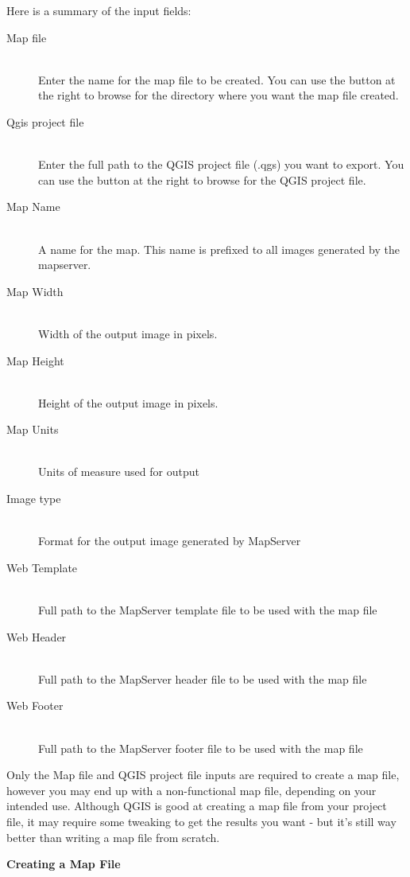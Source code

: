   Here is a summary of the input fields:
  \begin{description}

    \item [Map file] \mbox{}\\
Enter the name for the map file to be created. You can use the button at the right to browse for the directory where you want the map file created. 

\item [Qgis project file] \mbox{}\\
Enter the full path to the QGIS project file (.qgs) you want to export. You can use the button at the right to browse for the QGIS project file.
\item [Map Name] \mbox{}\\
A name for the map. This name is prefixed to all images generated by the mapserver.
\item [Map Width] \mbox{}\\
Width of the output image in pixels.

\item [Map Height] \mbox{}\\
Height of the output image in pixels.
\item [Map Units] \mbox{}\\
Units of measure used for output
\item [Image type] \mbox{}\\
Format for the output image generated by MapServer
\item [Web Template] \mbox{}\\
Full path to the MapServer template file to be used with the map file
\item [Web Header] \mbox{}\\
Full path to the MapServer header file to be used with the map file
\item [Web Footer] \mbox{}\\
Full path to the MapServer footer file to be used with the map file
\end{description}

Only the Map file and QGIS project file inputs are required to create a
map file, however you may end up with a non-functional map file, depending
on your intended use. Although QGIS is good at creating a map file from
your project file, it may require some tweaking to get the results you
want - but it's still way better than writing a map file from scratch.  

\textbf{Creating a Map File}

